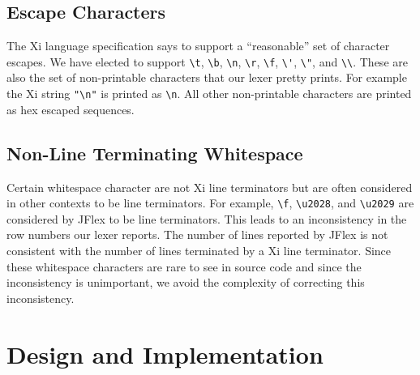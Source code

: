 \documentclass{hw}
\begin{document}
\subsection{Escape Characters}
The Xi language specification says to support a ``reasonable'' set of character
escapes. We have elected to support \verb$\t$, \verb$\b$, \verb$\n$, \verb$\r$,
\verb$\f$, \verb$\'$, \verb$\"$, and \verb$\\$. These are also the set of
non-printable characters that our lexer pretty prints. For example the Xi
string \verb$"\n"$ is printed as \verb$\n$. All other non-printable
characters are printed as hex escaped sequences.

\subsection{Non-Line Terminating Whitespace}
Certain whitespace character are not Xi line terminators but are often
considered in other contexts to be line terminators. For example, \verb$\f$,
\verb$\u2028$, and \verb$\u2029$ are considered by JFlex to be line
terminators.  This leads to an inconsistency in the row numbers our lexer
reports. The number of lines reported by JFlex is not consistent with the
number of lines terminated by a Xi line terminator. Since these whitespace
characters are rare to see in source code and since the inconsistency is
unimportant, we avoid the complexity of correcting this inconsistency.

\section{Design and Implementation}\label{sec:design}
\end{document}
